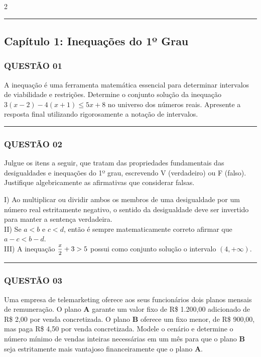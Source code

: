 \documentclass[twoside, 10pt, a4paper]{article}
\begin{document}
\par\vspace{0.3cm} 
\raggedcolumns
\begin{multicols*}{2}
\vspace{0.1cm}

\vspace{0cm} \noindent\textcolor{CorLinha}{\rule{\linewidth}{0.5pt}} \vspace{-0.2cm}
\subsection*{Capítulo 1: Inequações do 1º Grau}
\subsubsection*{QUESTÃO 01}
A inequação é uma ferramenta matemática essencial para determinar intervalos de viabilidade e restrições. Determine o conjunto solução da inequação $ 3(x - 2) - 4(x + 1) \le 5x + 8 $ no universo dos números reais. Apresente a resposta final utilizando rigorosamente a notação de intervalos.

\vspace{0cm} \noindent\textcolor{CorLinha}{\rule{\linewidth}{0.5pt}} \vspace{-0.2cm}
\subsubsection*{QUESTÃO 02}
Julgue os itens a seguir, que tratam das propriedades fundamentais das desigualdades e inequações do 1º grau, escrevendo V (verdadeiro) ou F (falso). Justifique algebricamente as afirmativas que considerar falsas.

I) Ao multiplicar ou dividir ambos os membros de uma desigualdade por um número real estritamente negativo, o sentido da desigualdade deve ser invertido para manter a sentença verdadeira.\\[0.3cm]
II) Se $ a < b $ e $ c < d $, então é sempre matematicamente correto afirmar que $ a - c < b - d $.\\[0.3cm]
III) A inequação $ \mfrac{x}{2} + 3 > 5 $ possui como conjunto solução o intervalo $ (4, +\infty) $.

\vspace{0cm} \noindent\textcolor{CorLinha}{\rule{\linewidth}{0.5pt}} \vspace{-0.2cm}
\subsubsection*{QUESTÃO 03}
Uma empresa de telemarketing oferece aos seus funcionários dois planos mensais de remuneração. O plano \textbf{A} garante um valor fixo de R\$ 1.200,00 adicionado de R\$ 2,00 por venda concretizada. O plano \textbf{B} oferece um fixo menor, de R\$ 900,00, mas paga R\$ 4,50 por venda concretizada. Modele o cenário e determine o número mínimo de vendas inteiras necessárias em um mês para que o plano \textbf{B} seja estritamente mais vantajoso financeiramente que o plano \textbf{A}.


\end{multicols*}
\end{document}
